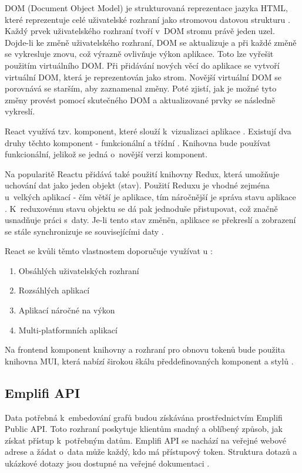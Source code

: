 \documentclass[czech, bc, kiv, he, iso690numb]{fasthesis}
\begin{document}
DOM (Document Object Model) je strukturovaná reprezentace jazyka HTML, které reprezentuje celé uživatelské rozhraní jako stromovou datovou strukturu \cite{whatIsDOM}. Každý prvek uživatelského
rozhraní tvoří v~DOM stromu právě jeden uzel. Dojde-li ke změně uživatelského rozhraní, DOM se aktualizuje 	a při každé změně se vykresluje znovu, což výrazně ovlivňuje výkon aplikace. 
Toto lze vyřešit použitím virtuálního DOM. Při přidávání nových věcí do aplikace se vytvoří virtuální DOM, která je reprezentován jako strom. Novější virtuální DOM se porovnává se starším, aby
zaznamenal změny. Poté zjistí, jak je možné tyto změny provést pomocí skutečného DOM a aktualizované prvky se následně vykreslí.

React využívá tzv. komponent, které slouží k~vizualizaci aplikace \cite{introToReact}. Existují dva druhy těchto komponent - funkcionální a třídní \cite{functionalVsClass}. Knihovna bude používat funkcionální, jelikož
se jedná o~novější verzi komponent.

Na popularitě Reactu přidává také použití knihovny Redux, která umožňuje uchování dat jako jeden objekt (stav). Použití Reduxu je vhodné zejména u~velkých aplikací - čím větší je aplikace, tím
náročnější je správa stavu aplikace \cite{introToRedux}. K~reduxovému stavu objektu se dá pak jednoduše přistupovat, což značně usnadňuje práci s~daty.
Je-li tento stav změněn, aplikace se překreslí a zobrazení se stále synchronizuje se souvisejícími daty \cite{whyUsingReact2}. 

React se kvůli těmto vlastnostem doporučuje využívat u \cite{whyUsingReact2}:
\begin{enumerate}
\item Obsáhlých uživatelských rozhraní
\item Rozsáhlých aplikací
\item Aplikací náročné na výkon
\item Multi-platformních aplikací
\end{enumerate}

Na frontend komponent knihovny a rozhraní pro obnovu tokenů bude použita knihovna MUI, která nabízí širokou škálu předdefinovaných komponent a stylů \cite{muiDocs}. 	

\subsection{Emplifi API}	
Data potřebná k~embedování grafů budou získávána prostřednictvím Emplifi Public API. 
Toto rozhraní poskytuje klientům snadný a oblíbený způsob, jak získat přístup k~potřebným datům. 
Emplifi API se nachází na veřejné webové adrese a žádat o~data může každý, kdo má přístupový token.
Struktura dotazů a ukázkové dotazy jsou dostupné na veřejné dokumentaci \cite{emplifiDocs}.
\end{document}
